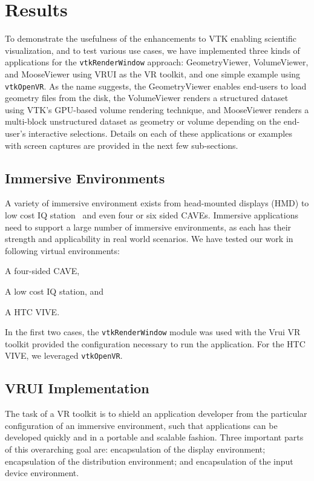 \section{Results}

To demonstrate the usefulness of the enhancements to VTK enabling scientific visualization, and to test various use cases, we have implemented three kinds of applications for the \texttt{vtkRenderWindow} approach: GeometryViewer, VolumeViewer, and MooseViewer using VRUI as the VR toolkit, and one simple example using \texttt{vtkOpenVR}. As the name suggests, the GeometryViewer enables end-users to load geometry files from the disk, the VolumeViewer renders a structured dataset using VTK's GPU-based volume rendering technique, and MooseViewer renders a multi-block unstructured dataset as geometry or volume depending on the end-user's interactive selections. Details on each of these applications or examples with screen captures are provided in the next few sub-sections. 

\subsection{Immersive Environments}

A variety of immersive environment exists from head-mounted displays (HMD) to low cost IQ station~\cite{Sherman:2010} and even four or six sided CAVEs. Immersive applications need to support a large number of immersive environments, as each has their strength and applicability in real world scenarios. We have tested our work in following virtual environments: 

\begin{compactitem}
\item A four-sided CAVE,
\item A low cost IQ station, and 
\item A HTC VIVE.
\end{compactitem}

In the first two cases, the \texttt{vtkRenderWindow} module was used with the Vrui VR toolkit provided the configuration necessary to run the application. For the HTC VIVE, we leveraged \texttt{vtkOpenVR}. 

\subsection{VRUI Implementation}

The task of a VR toolkit is to shield an application developer from the particular configuration of an immersive environment, such that applications can be developed quickly and in a portable and scalable fashion. Three important parts of this overarching goal are: encapsulation of the display environment; encapsulation of the distribution environment; and encapsulation of the input device environment.

